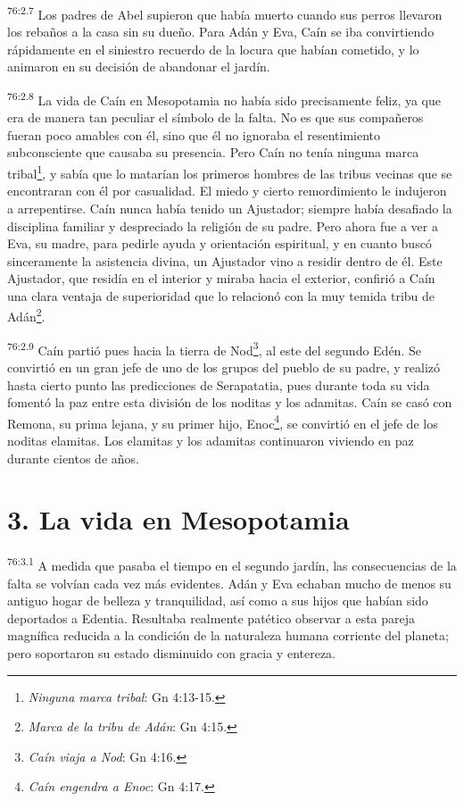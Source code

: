 \par
\textsuperscript{76:2.7} Los padres de Abel supieron que había muerto cuando sus perros llevaron los rebaños a la casa sin su dueño. Para Adán y Eva, Caín se iba convirtiendo rápidamente en el siniestro recuerdo de la locura que habían cometido, y lo animaron en su decisión de abandonar el jardín.

\par
\textsuperscript{76:2.8} La vida de Caín en Mesopotamia no había sido precisamente feliz, ya que era de manera tan peculiar el símbolo de la falta. No es que sus compañeros fueran poco amables con él, sino que él no ignoraba el resentimiento subconsciente que causaba su presencia. Pero Caín no tenía ninguna marca tribal\footnote{\textit{Ninguna marca tribal}: Gn 4:13-15.}, y sabía que lo matarían los primeros hombres de las tribus vecinas que se encontraran con él por casualidad. El miedo y cierto remordimiento le indujeron a arrepentirse. Caín nunca había tenido un Ajustador; siempre había desafiado la disciplina familiar y despreciado la religión de su padre. Pero ahora fue a ver a Eva, su madre, para pedirle ayuda y orientación espiritual, y en cuanto buscó sinceramente la asistencia divina, un Ajustador vino a residir dentro de él. Este Ajustador, que residía en el interior y miraba hacia el exterior, confirió a Caín una clara ventaja de superioridad que lo relacionó con la muy temida tribu de Adán\footnote{\textit{Marca de la tribu de Adán}: Gn 4:15.}.

\par
\textsuperscript{76:2.9} Caín partió pues hacia la tierra de Nod\footnote{\textit{Caín viaja a Nod}: Gn 4:16.}, al este del segundo Edén. Se convirtió en un gran jefe de uno de los grupos del pueblo de su padre, y realizó hasta cierto punto las predicciones de Serapatatia, pues durante toda su vida fomentó la paz entre esta división de los noditas y los adamitas. Caín se casó con Remona, su prima lejana, y su primer hijo, Enoc\footnote{\textit{Caín engendra a Enoc}: Gn 4:17.}, se convirtió en el jefe de los noditas elamitas. Los elamitas y los adamitas continuaron viviendo en paz durante cientos de años.

\section*{3. La vida en Mesopotamia}
\par
\textsuperscript{76:3.1} A medida que pasaba el tiempo en el segundo jardín, las consecuencias de la falta se volvían cada vez más evidentes. Adán y Eva echaban mucho de menos su antiguo hogar de belleza y tranquilidad, así como a sus hijos que habían sido deportados a Edentia. Resultaba realmente patético observar a esta pareja magnífica reducida a la condición de la naturaleza humana corriente del planeta; pero soportaron su estado disminuido con gracia y entereza.

